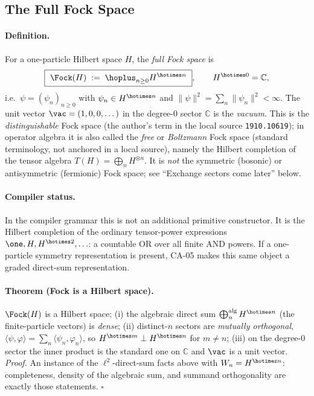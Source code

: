 \subsection{The Full Fock Space}

\paragraph{Definition.}
For a one-particle Hilbert space $H$, the \emph{full Fock space} is
\[
  \boxed{\ \Fock(H)\;:=\;\hoplus_{n\ge 0} H^{\hotimes n}\ },
  \qquad H^{\hotimes 0}=\mathbb C,
\]
i.e.\ $\psi=(\psi_n)_{n\ge0}$ with $\psi_n\in H^{\hotimes n}$ and
$\|\psi\|^2=\sum_n\|\psi_n\|^2<\infty$. The unit vector $\vac=(1,0,0,\dots)$ in the
degree-$0$ sector $\mathbb C$ is the \emph{vacuum}. This is the
\emph{distinguishable} Fock space (the author's term in the local source
\texttt{1910.10619}); in operator algebra it is also called the \emph{free} or
\emph{Boltzmann} Fock space (standard terminology, not anchored in a local
source), namely the Hilbert completion of the tensor algebra
$T(H)=\bigoplus_n H^{\otimes n}$. It is \emph{not} the symmetric (bosonic)
or antisymmetric (fermionic) Fock space; see ``Exchange sectors come later''
below.

\paragraph{Compiler status.}
In the compiler grammar this is not an additional primitive constructor.  It is
the Hilbert completion of the ordinary tensor-power expressions
\(\one,H,H^{\hotimes2},\ldots\): a countable OR over all finite AND powers.  If a
one-particle symmetry representation is present, CA-05 makes this same object a
graded direct-sum representation.

\paragraph{Theorem (Fock is a Hilbert space).}
$\Fock(H)$ is a Hilbert space; (i) the algebraic direct sum
$\bigoplus^{\mathrm{alg}}_n H^{\hotimes n}$ (the finite-particle vectors) is
\emph{dense}; (ii) distinct-$n$ sectors are \emph{mutually orthogonal},
$\langle\psi,\varphi\rangle=\sum_n\langle\psi_n,\varphi_n\rangle$, so
$H^{\hotimes m}\perp H^{\hotimes n}$ for $m\neq n$; (iii) on the degree-$0$ sector
the inner product is the standard one on $\mathbb C$ and $\vac$ is a unit vector.
\emph{Proof.} An instance of the $\ell^2$-direct-sum facts above with
$W_n=H^{\hotimes n}$: completeness, density of the algebraic sum, and summand
orthogonality are exactly those statements. $\square$

